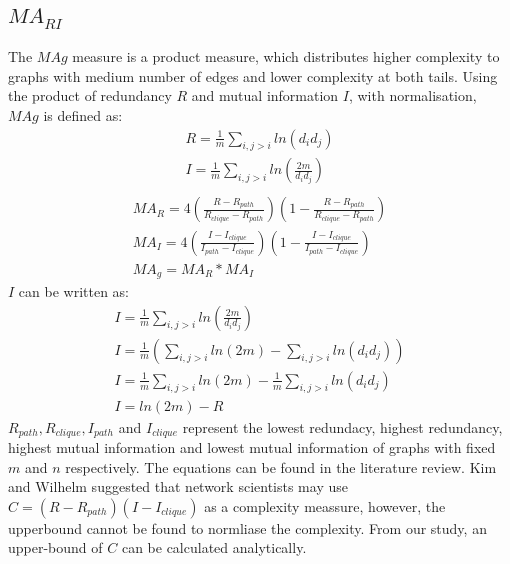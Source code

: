 \documentclass[12pt]{article}
\begin{document}
\subsection{$MA_{RI}$}
The $MAg$ measure is a product measure, which distributes higher complexity to graphs with medium number of edges and lower complexity at both tails. Using the product of redundancy $R$ and mutual information $I$, with normalisation, $MAg$ is defined as\cite{KIM20082637}:
\begin{equation}
    \label{eq:RandI}
    \begin{gathered}
        R = \frac{1}{m}\sum_{i,j>i}ln(d_id_j)\\
        I = \frac{1}{m}\sum_{i,j>i}ln(\frac{2m}{d_id_j})\\
    \end{gathered}
\end{equation}
\begin{equation}
    \label{eq:mag}
    \begin{gathered}
        MA_R = 4(\frac{R-R_{path}}{R_{clique}-R_{path}})(1-\frac{R-R_{path}}{R_{clique}-R_{path}})\\
        MA_I = 4(\frac{I-I_{clique}}{I_{path}-I_{clique}})(1-\frac{I-I_{clique}}{I_{path}-I_{clique}})\\
        MA_g = MA_R * MA_I
    \end{gathered}
\end{equation}
$I$ can be written as:
\begin{equation}
    \label{eq:mutual_info}
    \begin{gathered}
        I = \frac{1}{m}\sum_{i,j>i}ln(\frac{2m}{d_id_j})\\
        I = \frac{1}{m}(\sum_{i,j>i}ln(2m)-\sum_{i,j>i}ln(d_id_j))\\
        I = \frac{1}{m}\sum_{i,j>i}ln(2m)-\frac{1}{m}\sum_{i,j>i}ln(d_id_j)\\
        I = ln(2m)-R
    \end{gathered}
\end{equation}
\noindent
$R_{path},R_{clique},I_{path}$ and $I_{clique}$ represent the lowest redundacy, highest redundancy, highest mutual information and lowest mutual information of graphs with fixed $m$ and $n$ respectively. The equations can be found in the literature review. Kim and Wilhelm suggested that network scientists may use $C=(R-R_{path})(I-I_{clique})$ as a complexity meassure, however, the upperbound cannot be found to normliase the complexity. From our study, an upper-bound of $C$ can be calculated analytically.\\
\end{document}
